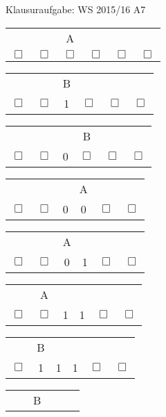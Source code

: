 \begin{frame}{Klausuraufgabe: WS 2015/16 A7}
  \begin{minipage}[t!]{0.5\textwidth}
    \begin{center}
      \begin{tabular}{cccccc}
        & & A & & & \\
        $\Box$ & $\Box$ & $\Box$ & $\Box$ & $\Box$ & $\Box$ \\
      \end{tabular}
      \begin{tabular}{cccccc}
        & & B & & & \\
        $\Box$ & $\Box$ & 1 & $\Box$ & $\Box$ & $\Box$ \\
      \end{tabular}
      \begin{tabular}{cccccc}
        & & & B & & \\
        $\Box$ & $\Box$ & 0 & $\Box$ & $\Box$ & $\Box$ \\
      \end{tabular}
      \begin{tabular}{cccccc}
        & & & A & & \\
        $\Box$ & $\Box$ & 0 & 0 & $\Box$ & $\Box$ \\
      \end{tabular}
      \begin{tabular}{cccccc}
        & & A & & & \\
        $\Box$ & $\Box$ & 0 & 1 & $\Box$ & $\Box$ \\
      \end{tabular}
      \begin{tabular}{cccccc}
        & A & & & & \\
        $\Box$ & $\Box$ & 1 & 1 & $\Box$ & $\Box$ \\
      \end{tabular}
    \end{center}
  \end{minipage}
  \begin{minipage}[t!]{0.4\textwidth}
    \begin{center}
      \begin{tabular}{cccccc}
        & B & & & & \\
        $\Box$ & 1 & 1 & 1 & $\Box$ & $\Box$ \\
      \end{tabular}
      \begin{tabular}{cccccc}
        & & B & & & \\

\end{tabular}
\end{center}
\end{minipage}
\end{frame}
